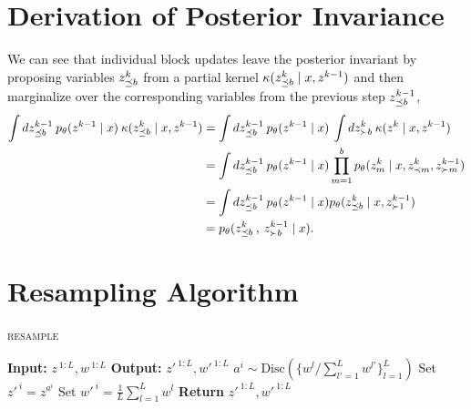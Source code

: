 \documentclass{article}
\theoremstyle{definition}
\begin{document}
\section{ Derivation of Posterior Invariance}
\label{appendix:posterior-invariance}
We can see that individual block updates leave the posterior invariant by proposing variables $z^k_{\preceq b}$ from a partial kernel $\kappa(z^k_{\preceq b} \mid x, z^{k-1})$ and then marginalize over the corresponding variables from the previous step $z^{k-1}_{\preceq b}$,
\begin{align*}
    \int 
    dz^{k-1}_{\preceq b} 
    \:
    p_\theta(z^{k-1} \mid x) 
    \: 
    \kappa(z^k_{\preceq b} \mid x, z^{k-1}) 
    &=
    \int 
    dz^{k-1}_{\preceq b} 
    \:
    p_\theta(z^{k-1} \mid x) 
    \: 
    \int dz^k_{\succ b}
    \:
    \kappa(z^k \mid x, z^{k-1})
    \\
    &= 
    \int 
    dz^{k-1}_{\preceq b} 
    \: 
    p_\theta(z^{k-1} \mid x)
    \prod_{m=1}^b p_\theta(z^k_m \mid x, z^{k}_{\prec m}, z^{k-1}_{\succ m})
    \\
    &=
    \int 
    dz^{k-1}_{\preceq b} 
    \: 
    p_\theta(z^{k-1} \mid x)
    p_\theta(z^k_{\preceq b} \mid x, z^{k-1}_{\succ 1})
    \\
    &=
    p_\theta(z^k_{\preceq b}\:, \: z^{k-1}_{\succ b} \mid x)
    .
\end{align*}

\section{Resampling Algorithm}
\label{appendix:resample-algo}
\begin{algorithm}[!h]
  \caption{\textsc{resample}}
  \label{alg:resample}
\begin{algorithmic}[1]
\small
  \State \textbf{Input:} $z^{\:1:L}, w^{\:1:L}$
  \State \textbf{Output:} $z'^{\:1:L}, w'^{\:1:L}$
    \State $a^i \sim \mathrm{Disc}(\{w^l / \sum_{l' = 1}^L w^{l'}\}_{l=1}^L)$ 
    \State Set $ z'^{\:i} = z^{a^i}$
    \State Set $ w'^{\:i} = \frac{1}{L} \sum_{l = 1}^L w^l$
    \EndFor
  \State \textbf{Return} $z'^{\:1:L}, w'^{\:1:L}$
\end{algorithmic}
\end{algorithm}
\end{document}
